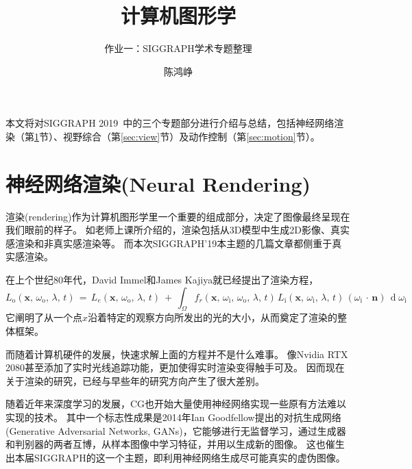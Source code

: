 \documentclass[logo,reportComp]{thesis}
\title{计算机图形学}
\subtitle{作业一：SIGGRAPH学术专题整理}
\author{陈鸿峥}
\begin{document}
\maketitle

本文将对SIGGRAPH 2019~\cite{siggraph,siggraph_tech}中的三个专题部分进行介绍与总结，包括神经网络渲染（第\ref{sec:rendering}节）、视野综合（第\ref{sec:view}节）及动作控制（第\ref{sec:motion}节）。

\section{神经网络渲染(Neural Rendering)}
\label{sec:rendering}
渲染(rendering)作为计算机图形学里一个重要的组成部分，决定了图像最终呈现在我们眼前的样子。
如老师上课所介绍的，渲染包括从3D模型中生成2D影像、真实感渲染和非真实感渲染等。
而本次SIGGRAPH'19本主题的几篇文章都侧重于真实感渲染。

在上个世纪80年代，David Immel和James Kajiya就已经提出了渲染方程\cite{rendering_equ}，
\[L_{{{\text{o}}}}({\mathbf  x},\,\omega _{{{\text{o}}}},\,\lambda ,\,t)\,=\,L_{e}({\mathbf  x},\,\omega _{{{\text{o}}}},\,\lambda ,\,t)\ +\,\int _{\Omega }f_{r}({\mathbf  x},\,\omega _{{{\text{i}}}},\,\omega _{{{\text{o}}}},\,\lambda ,\,t)\,L_{{{\text{i}}}}({\mathbf  x},\,\omega _{{{\text{i}}}},\,\lambda ,\,t)\,(\omega _{{{\text{i}}}}\,\cdot \,{\mathbf  n})\,\operatorname d\omega _{{{\text{i}}}}\]
它阐明了从一个点$x$沿着特定的观察方向所发出的光的大小，从而奠定了渲染的整体框架。

而随着计算机硬件的发展，快速求解上面的方程并不是什么难事。
像Nvidia RTX 2080甚至添加了实时光线追踪功能，更加使得实时渲染变得触手可及。
因而现在关于渲染的研究，已经与早些年的研究方向产生了很大差别。

随着近年来深度学习的发展，CG也开始大量使用神经网络实现一些原有方法难以实现的技术。
其中一个标志性成果是2014年Ian Goodfellow提出的对抗生成网络(Generative Adversarial Networks, GANs)\cite{gan:goodfellow}，它能够进行无监督学习，通过生成器和判别器的两者互博，从样本图像中学习特征，并用以生成新的图像。
这也催生出本届SIGGRAPH的这一个主题，即利用神经网络生成尽可能真实的虚伪图像。
\end{document}
